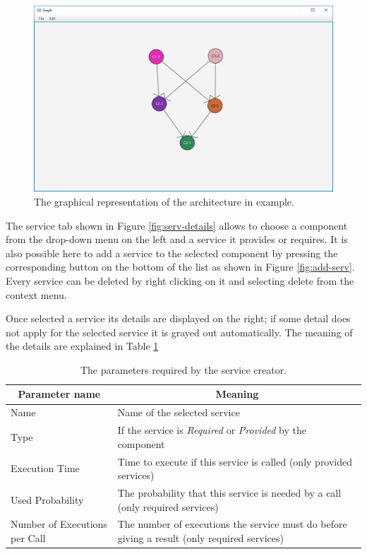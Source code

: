 \begin{figure}[!ht]
	\centerline
	{\includegraphics[scale=0.50]{img/view_arch.png}}
	\caption[Architecture graphical representation]{The graphical representation of the architecture in example.}
	\label{fig:view-arch}
\end{figure}

The service tab shown in Figure \ref{fig:serv-details} allows to choose a component from the drop-down menu on the left and a service it provides or requires. It is also possible here to add a service to the selected component by pressing the corresponding button on the bottom of the list as shown in Figure \ref{fig:add-serv}. Every service can be deleted by right clicking on it and selecting delete from the context menu.

Once selected a service its details are displayed on the right; if some detail does not apply for the selected service it is grayed out automatically. The meaning of the details are explained in Table \ref{tab:serv-details}

\begin{table}[ht!b]
	\centering
	\begin{tabular}{|p{}|p{9cm}|}
		\hline
		\multicolumn{1}{|c|}{Parameter name} & \multicolumn{1}{c|}{Meaning} \\
		\hline 
		Name & Name of the selected service \\
		\hline
		Type & If the service is \emph{Required} or \emph{Provided} by the component \\
		\hline
		Execution Time & Time to execute if this service is called (only provided services)\\
		\hline
		Used Probability & The probability that this service is needed by a call (only required services)\\
		\hline
		Number of Executions per Call & The number of executions the service must do before giving a result (only required services) \\
		\hline
		
	\end{tabular} 
	\caption[Service parameters]{The parameters required by the service creator.}
	\label{tab:serv-details}
\end{table}


